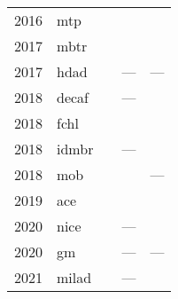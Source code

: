 \begin{table}[t]
\begin{center}
\begin{tabular}{@{\hspace{2pt}}llccc@{\hspace{2pt}}}
		2016 & \acs{mtp}   & \cite{s2016q}          & \cite{ps2017q,gps2018q,ns2018q,s2019q}                                                               & \cite{ngps2021q}               \\
		2017 & \acs{mbtr}  & \cite{hr2022q}          & \cite{nrwh2019q}                                                                                & \cite{availmbtr,hjrf2020q} \\
		2017 & \acs{hdad}  & \cite{fhrl2017q} & ---                                                                                                     & ---                               \\
		2018 & \acs{decaf} & \cite{tzk2018q}        & ---                                                                                                     & \cite{availdecaf}              \\
		2018 & \acs{fchl}  & \cite{fchl2018q}       & \cite{cbfl2020q}                                                                                    & \cite{availqml}                \\
		2018 & \acs{idmbr} & \cite{ptm2018q}        & ---                                                                                                     & \cite{availidmbr}              \\
		2018 & \acs{mob}   & \cite{wcm2018q}        & \cite{cwcm2019q,hslm2021q,lhdm2021q}                                                                 & ---                               \\ %
		2019 & \acs{ace}   & \cite{d2019q}         & \cite{dboo2022q,d2020Aq}                                                                            & \cite{lood2021q,availace}\\
		2020 & \acs{nice}  & \cite{npc2020q}        & ---                                                                                                     & \cite{availnice}               \\
		2020 & \acs{gm}    & \cite{zk2020q}         & ---                                                                                                     & ---                               \\
		2021 & \acs{milad} & \cite{u2021q}           & --- & \cite{availmilad} \\
		\bottomrule
	\end{tabular}
	\end{center}
\end{table}


